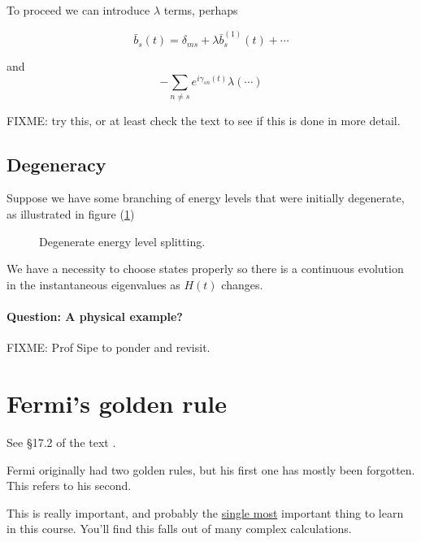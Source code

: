 To proceed we can introduce $\lambda$ terms, perhaps

\begin{equation}\label{eqn:qmTwoL9:290}
\bar{b}_s(t) = \delta_{ms} + \lambda \bar{b}^{(1)}_s(t) + \cdots
\end{equation}

and 
\begin{equation}\label{eqn:qmTwoL9:310}
- \sum_{n \ne s} e^{i \gamma_{sn}(t)} \lambda (\cdots)
\end{equation}

FIXME: try this, or at least check the text to see if this is done in more detail.

\subsection{Degeneracy}

Suppose we have some branching of energy levels that were initially degenerate, as illustrated in figure (\ref{fig:qmTwoL9fig3})

\begin{figure}[htp]
   \centering
   \def\svgwidth{0.3\columnwidth}
   
   \caption{Degenerate energy level splitting.}\label{fig:qmTwoL9fig3}
\end{figure}

We have a necessity to choose states properly so there is a continuous evolution in the instantaneous eigenvalues as $H(t)$ changes.

\paragraph{Question: A physical  example?}

FIXME: Prof Sipe to ponder and revisit.

\section{Fermi's golden rule}

See \S 17.2 of the text \cite{desai2009quantum}.

Fermi originally had two golden rules, but his first one has mostly been forgotten.  This refers to his second.

This is really important, and probably the \underline{single most} important thing to learn in this course.  You'll find this falls out of many complex calculations.

